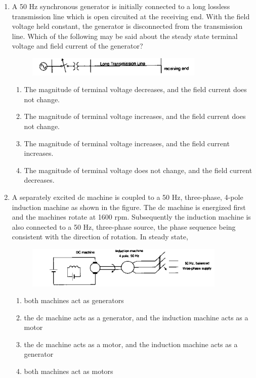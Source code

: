 \documentclass[12pt]{article}
\theoremstyle{remark}
\begin{document}
\begin{enumerate}
\item A 50 Hz synchronous generator is initially connected to a long lossless transmission line which is open circuited at the receiving end. With the field voltage held constant, the generator is disconnected from the transmission line. Which of the following may be said about the steady state terminal voltage and field current of the generator?
\begin{figure}[H]
    \centering
    \includegraphics[width=0.8\textwidth]{Figs/Q39.png}
    \caption{}
    \label{fig:1.29}
\end{figure}
\begin{enumerate}
    \item The magnitude of terminal voltage decreases, and the field current does not change.
    \item The magnitude of terminal voltage increases, and the field current does not change.
    \item The magnitude of terminal voltage increases, and the field current increases.
    \item The magnitude of terminal voltage does not change, and the field current decreases.
\end{enumerate}
\hfill{}

\item A separately excited dc machine is coupled to a 50 Hz, three-phase, 4-pole induction machine as shown in the figure. The dc machine is energized first and the machines rotate at 1600 rpm. Subsequently the induction machine is also connected to a 50 Hz, three-phase source, the phase sequence being consistent with the direction of rotation. In steady state,
\begin{figure}[H]
    \centering
    \includegraphics[width=0.9\textwidth]{Figs/Q40.png}
    \caption{}
    \label{fig:1.30}
\end{figure}
\begin{enumerate}
    \item both machines act as generators
    \item the dc machine acts as a generator, and the induction machine acts as a motor
    \item the dc machine acts as a motor, and the induction machine acts as a generator
    \item both machines act as motors
\end{enumerate}
\hfill{}


\end{enumerate}
\end{document}

